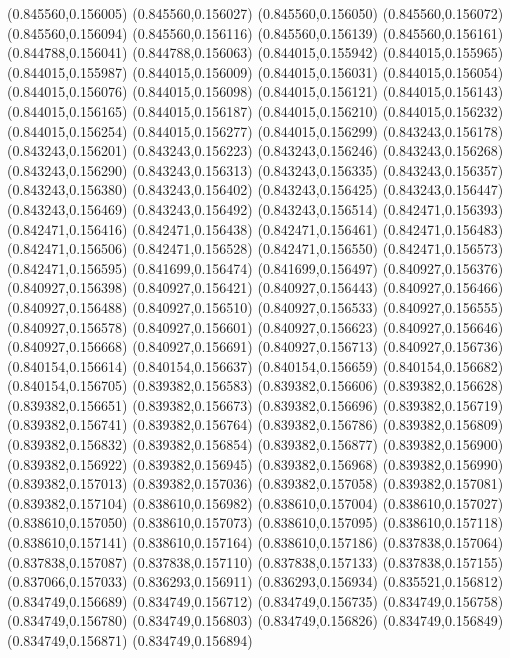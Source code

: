 (0.845560,0.156005)
(0.845560,0.156027)
(0.845560,0.156050)
(0.845560,0.156072)
(0.845560,0.156094)
(0.845560,0.156116)
(0.845560,0.156139)
(0.845560,0.156161)
(0.844788,0.156041)
(0.844788,0.156063)
(0.844015,0.155942)
(0.844015,0.155965)
(0.844015,0.155987)
(0.844015,0.156009)
(0.844015,0.156031)
(0.844015,0.156054)
(0.844015,0.156076)
(0.844015,0.156098)
(0.844015,0.156121)
(0.844015,0.156143)
(0.844015,0.156165)
(0.844015,0.156187)
(0.844015,0.156210)
(0.844015,0.156232)
(0.844015,0.156254)
(0.844015,0.156277)
(0.844015,0.156299)
(0.843243,0.156178)
(0.843243,0.156201)
(0.843243,0.156223)
(0.843243,0.156246)
(0.843243,0.156268)
(0.843243,0.156290)
(0.843243,0.156313)
(0.843243,0.156335)
(0.843243,0.156357)
(0.843243,0.156380)
(0.843243,0.156402)
(0.843243,0.156425)
(0.843243,0.156447)
(0.843243,0.156469)
(0.843243,0.156492)
(0.843243,0.156514)
(0.842471,0.156393)
(0.842471,0.156416)
(0.842471,0.156438)
(0.842471,0.156461)
(0.842471,0.156483)
(0.842471,0.156506)
(0.842471,0.156528)
(0.842471,0.156550)
(0.842471,0.156573)
(0.842471,0.156595)
(0.841699,0.156474)
(0.841699,0.156497)
(0.840927,0.156376)
(0.840927,0.156398)
(0.840927,0.156421)
(0.840927,0.156443)
(0.840927,0.156466)
(0.840927,0.156488)
(0.840927,0.156510)
(0.840927,0.156533)
(0.840927,0.156555)
(0.840927,0.156578)
(0.840927,0.156601)
(0.840927,0.156623)
(0.840927,0.156646)
(0.840927,0.156668)
(0.840927,0.156691)
(0.840927,0.156713)
(0.840927,0.156736)
(0.840154,0.156614)
(0.840154,0.156637)
(0.840154,0.156659)
(0.840154,0.156682)
(0.840154,0.156705)
(0.839382,0.156583)
(0.839382,0.156606)
(0.839382,0.156628)
(0.839382,0.156651)
(0.839382,0.156673)
(0.839382,0.156696)
(0.839382,0.156719)
(0.839382,0.156741)
(0.839382,0.156764)
(0.839382,0.156786)
(0.839382,0.156809)
(0.839382,0.156832)
(0.839382,0.156854)
(0.839382,0.156877)
(0.839382,0.156900)
(0.839382,0.156922)
(0.839382,0.156945)
(0.839382,0.156968)
(0.839382,0.156990)
(0.839382,0.157013)
(0.839382,0.157036)
(0.839382,0.157058)
(0.839382,0.157081)
(0.839382,0.157104)
(0.838610,0.156982)
(0.838610,0.157004)
(0.838610,0.157027)
(0.838610,0.157050)
(0.838610,0.157073)
(0.838610,0.157095)
(0.838610,0.157118)
(0.838610,0.157141)
(0.838610,0.157164)
(0.838610,0.157186)
(0.837838,0.157064)
(0.837838,0.157087)
(0.837838,0.157110)
(0.837838,0.157133)
(0.837838,0.157155)
(0.837066,0.157033)
(0.836293,0.156911)
(0.836293,0.156934)
(0.835521,0.156812)
(0.834749,0.156689)
(0.834749,0.156712)
(0.834749,0.156735)
(0.834749,0.156758)
(0.834749,0.156780)
(0.834749,0.156803)
(0.834749,0.156826)
(0.834749,0.156849)
(0.834749,0.156871)
(0.834749,0.156894)
